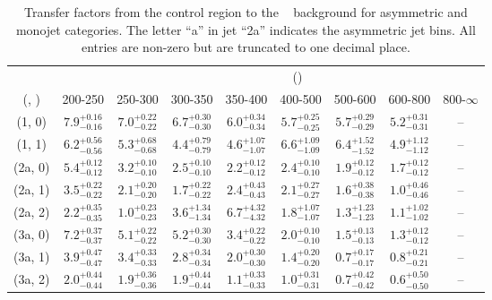 \begin{table}[h!]
\tiny
\centering
\caption{Transfer factors from the \mmj control region to the \zInv~ background for asymmetric and monojet categories. The letter ``a'' in jet \eg ``2a''  indicates the asymmetric jet bins. All entries are non-zero but are truncated to one decimal place.\label{tab:tf_mumu_zinv_asym}}
\begin{tabular}
{ccccccccc}
	\hline\hline
&	& \multicolumn{8}{c}{\scalht (\gev)} \\ 
	 (\njet,  \nb) & 200-250 & 250-300 & 300-350 & 350-400 & 400-500 & 500-600 & 600-800 & 800-$\infty$ \\ [0.8ex] 
\hline
	(1, 0) & $7.9^{+ 0.16 }_{- 0.16 }$ & $7.0^{+ 0.22 }_{- 0.22 }$ & $6.7^{+ 0.30 }_{- 0.30 }$ & $6.0^{+ 0.34 }_{- 0.34 }$ & $5.7^{+ 0.25 }_{- 0.25 }$ & $5.7^{+ 0.29 }_{- 0.29 }$ & $5.2^{+ 0.31 }_{- 0.31 }$ & -- \\[0.5ex] 
	(1, 1) & $6.2^{+ 0.56 }_{- 0.56 }$ & $5.3^{+ 0.68 }_{- 0.68 }$ & $4.4^{+ 0.79 }_{- 0.79 }$ & $4.6^{+ 1.07 }_{- 1.07 }$ & $6.6^{+ 1.09 }_{- 1.09 }$ & $6.4^{+ 1.52 }_{- 1.52 }$ & $4.9^{+ 1.12 }_{- 1.12 }$ & -- \\[0.5ex] 
	(2a, 0) & $5.4^{+ 0.12 }_{- 0.12 }$ & $3.2^{+ 0.10 }_{- 0.10 }$ & $2.5^{+ 0.10 }_{- 0.10 }$ & $2.2^{+ 0.12 }_{- 0.12 }$ & $2.4^{+ 0.10 }_{- 0.10 }$ & $1.9^{+ 0.12 }_{- 0.12 }$ & $1.7^{+ 0.12 }_{- 0.12 }$ & -- \\[0.5ex] 
	(2a, 1) & $3.5^{+ 0.22 }_{- 0.22 }$ & $2.1^{+ 0.20 }_{- 0.20 }$ & $1.7^{+ 0.22 }_{- 0.22 }$ & $2.4^{+ 0.43 }_{- 0.43 }$ & $2.1^{+ 0.27 }_{- 0.27 }$ & $1.6^{+ 0.38 }_{- 0.38 }$ & $1.0^{+ 0.46 }_{- 0.46 }$ & -- \\[0.5ex] 
	(2a, 2) & $2.2^{+ 0.35 }_{- 0.35 }$ & $1.0^{+ 0.23 }_{- 0.23 }$ & $3.6^{+ 1.34 }_{- 1.34 }$ & $6.7^{+ 4.32 }_{- 4.32 }$ & $1.8^{+ 1.07 }_{- 1.07 }$ & $1.3^{+ 1.23 }_{- 1.23 }$ & $1.1^{+ 1.02 }_{- 1.02 }$ & -- \\[0.5ex] 
	(3a, 0) & $7.2^{+ 0.37 }_{- 0.37 }$ & $5.1^{+ 0.22 }_{- 0.22 }$ & $5.2^{+ 0.30 }_{- 0.30 }$ & $3.4^{+ 0.22 }_{- 0.22 }$ & $2.0^{+ 0.10 }_{- 0.10 }$ & $1.5^{+ 0.13 }_{- 0.13 }$ & $1.3^{+ 0.12 }_{- 0.12 }$ & -- \\[0.5ex] 
	(3a, 1) & $3.9^{+ 0.47 }_{- 0.47 }$ & $3.4^{+ 0.33 }_{- 0.33 }$ & $2.8^{+ 0.34 }_{- 0.34 }$ & $2.0^{+ 0.30 }_{- 0.30 }$ & $1.4^{+ 0.20 }_{- 0.20 }$ & $0.7^{+ 0.17 }_{- 0.17 }$ & $0.8^{+ 0.21 }_{- 0.21 }$ & -- \\[0.5ex] 
	(3a, 2) & $2.0^{+ 0.44 }_{- 0.44 }$ & $1.9^{+ 0.36 }_{- 0.36 }$ & $1.9^{+ 0.44 }_{- 0.44 }$ & $1.1^{+ 0.33 }_{- 0.33 }$ & $1.0^{+ 0.31 }_{- 0.31 }$ & $0.7^{+ 0.42 }_{- 0.42 }$ & $0.6^{+ 0.50 }_{- 0.50 }$ & -- \\[0.5ex] 

\end{tabular}
\end{table}
